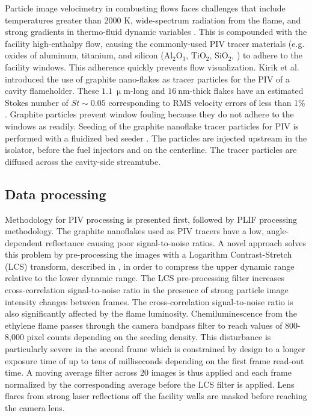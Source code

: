 Particle image velocimetry in combusting flows faces challenges that include temperatures greater than 2000 K, wide-spectrum radiation from the flame, and strong gradients in thermo-fluid dynamic variables \citep{StellaGujKompenhansEtAl2001}. This is compounded with the facility high-enthalpy flow, causing the commonly-used PIV tracer materials (e.g. oxides of aluminum, titanium, and silicon ($\mathrm{Al_2O_3}$, $\mathrm{TiO_2}$, $\mathrm{SiO_2}$, \citep{Melling1997, FangHong2018}) to adhere to the facility windows. This adherence quickly prevents flow visualization. 
Kirik et al. \cite{KirikGoyneMcDanielEtAl2017} introduced the use of graphite nano-flakes as tracer particles for the PIV of a cavity flameholder. These $1.1~ \mathrm{\upmu m}$-long and $16~ \mathrm{nm}$-thick flakes have an estimated Stokes number of $St\sim 0.05$ \cite{KirikGoyneMcDanielEtAl2015} corresponding to RMS velocity errors of less than 1\% \citep{SamimyLele1991}. 
Graphite particles prevent window fouling because they do not adhere to the windows as readily. 
Seeding of the graphite nanoflake tracer particles for PIV \citep{KirikGoyneMcDanielEtAl2015} is performed with a fluidized bed seeder \citep{HowisonGoyne2010}. The particles are injected upstream in the isolator, before the fuel injectors and on the centerline. The tracer particles are diffused across the cavity-side streamtube. 

\subsection*{Data processing}
Methodology for PIV processing is presented first, followed by PLIF processing methodology. The graphite nanoflakes used as PIV tracers have a low, angle-dependent reflectance causing poor signal-to-noise ratios. A novel approach solves this problem by pre-processing the images with a Logarithm Contrast-Stretch (LCS) transform, described in \cite{LieberThesis}, in order to compress the upper dynamic range relative to the lower dynamic range. The LCS pre-processing filter increases cross-correlation signal-to-noise ratio in the presence of strong particle image intensity changes between frames. 
The cross-correlation signal-to-noise ratio is also significantly affected by the flame luminosity. Chemiluminescence from the ethylene flame passes through the camera bandpass filter to reach values of 800-8,000 pixel counts depending on the seeding density. This disturbance is particularly severe in the second frame which is constrained by design to a longer exposure time of up to tens of milliseconds depending on the first frame read-out time. A moving average filter across 20 images is thus applied and each frame normalized by the corresponding average before the LCS filter is applied. Lens flares from strong laser reflections off the facility walls are masked before reaching the camera lens.

